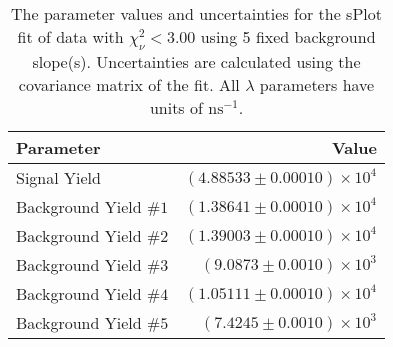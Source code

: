 
\begin{table}
    \begin{center}
        \begin{tabular}{lr}\toprule
            Parameter & Value \\\midrule
            Signal Yield & $(4.88533 \pm 0.00010) \times 10^{4}$ \\
            Background Yield $\#1$ & $(1.38641 \pm 0.00010) \times 10^{4}$ \\
            Background Yield $\#2$ & $(1.39003 \pm 0.00010) \times 10^{4}$ \\
            Background Yield $\#3$ & $(9.0873 \pm 0.0010) \times 10^{3}$ \\
            Background Yield $\#4$ & $(1.05111 \pm 0.00010) \times 10^{4}$ \\
            Background Yield $\#5$ & $(7.4245 \pm 0.0010) \times 10^{3}$ \\\bottomrule
        \end{tabular}
        \caption{The parameter values and uncertainties for the sPlot fit of data with $\chi^2_\nu < 3.00$ using 5 fixed background slope(s). Uncertainties are calculated using the covariance matrix of the fit. All $\lambda$ parameters have units of $\si{\nano\second}^{-1}$.}
    \end{center}
\end{table}

